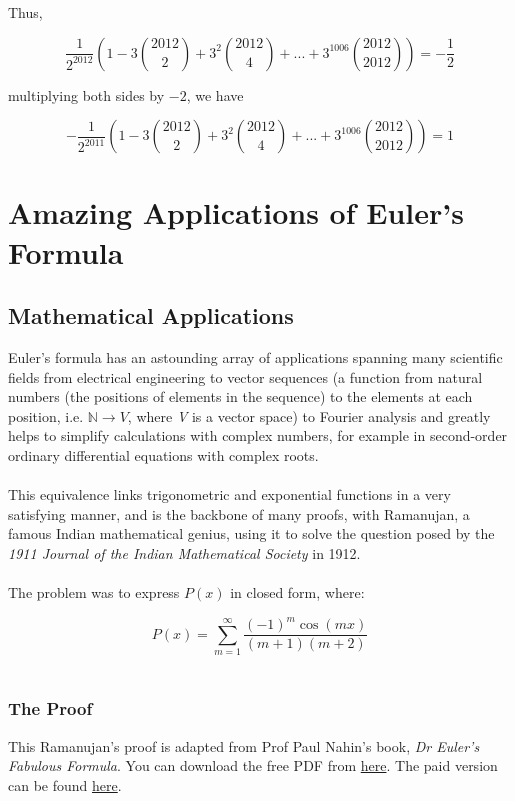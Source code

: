 \documentclass[a4paper,12pt,oneside]{book}
\begin{document}
Thus, 

$$\frac{1}{2^{2012}} (1 - 3{2012\choose 2} + 3^{2}{2012\choose4}+...+3^{1006}{2012\choose2012}) = -\frac{1}{2}$$

multiplying both sides by $-2$, we have 

$$-\frac{1}{2^{2011}} (1 - 3{2012\choose 2} + 3^{2}{2012\choose4}+...+3^{1006}{2012\choose2012}) = 1$$


\part{Amazing Applications of Euler's Formula}

\chapter{Mathematical Applications}
Euler's formula has an astounding array of applications spanning many scientific fields from electrical engineering to vector sequences (a function from natural numbers (the positions of elements in the sequence) to the elements at each position, i.e. $\mathbb{N} \xrightarrow{} \textit{V}$, where \textit{V} is a vector space) to Fourier analysis and greatly helps to simplify calculations with complex numbers, for example in second-order ordinary differential equations with complex roots.\\
\\
This equivalence links trigonometric and exponential functions in a very satisfying manner, and is the backbone of many proofs, with Ramanujan, a famous Indian mathematical genius, using it to solve the question posed by the \textit{1911 Journal of the Indian Mathematical Society} in 1912.\\
\\
The problem was to express $P(x)$ in closed form, where:

\[ P(x) = \sum_{m=1}^{\infty} \frac{(-1)^m \cos(mx)}{(m+1)(m+2)} \]\\

\section{The Proof}
This Ramanujan's proof is adapted from Prof Paul Nahin's book, \textit{Dr Euler's Fabulous Formula}. You can download the free PDF from \href{https://libgen.is/book/index.php?md5=7FAA8A069E9204C7561DEC9ED451E7F8}{here}. The paid version can be found \href{https://press.princeton.edu/books/paperback/9780691175911/dr-eulers-fabulous-formula}{here}.
\newpage
\end{document}
